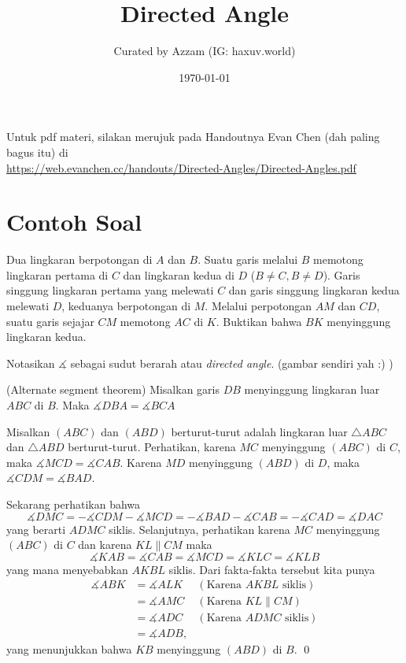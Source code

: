 \documentclass[11pt]{scrartcl}
\title{Directed Angle}
\author{Curated by Azzam (IG: haxuv.world)}
\date{\today}
\begin{document}
	\maketitle
    Untuk pdf materi, silakan merujuk pada Handoutnya Evan Chen (dah paling bagus itu) di \\\url{https://web.evanchen.cc/handouts/Directed-Angles/Directed-Angles.pdf}
    \section{Contoh Soal}
    Dua lingkaran berpotongan di $A$ dan $B$. Suatu garis melalui $B$ memotong lingkaran pertama di $C$ dan lingkaran kedua di $D$ ($B \neq C, B \neq D$).  Garis singgung lingkaran pertama yang melewati $C$ dan garis singgung lingkaran kedua melewati $D$, keduanya berpotongan di $M$. Melalui perpotongan $AM$ dan $CD$, suatu garis sejajar $CM$ memotong $AC$ di $K$. Buktikan bahwa $BK$ menyinggung lingkaran kedua.
    \vspace{0.2cm}
    \begin{solusi}
        Notasikan $\measuredangle$ sebagai sudut berarah atau \textit{directed angle}. (gambar sendiri yah :) )
		
		\begin{lemmarev}
		(Alternate segment theorem) Misalkan garis $DB$ menyinggung lingkaran luar $ABC$ di $B$. Maka $\measuredangle DBA = \measuredangle BCA$
		\end{lemmarev}
		Misalkan $(ABC)$ dan $(ABD)$ berturut-turut adalah lingkaran luar $\triangle ABC$ dan $\triangle ABD$ berturut-turut. Perhatikan, karena $MC$ menyinggung $(ABC)$ di $C$, maka $\measuredangle MCD = \measuredangle CAB$. Karena $MD$ menyinggung $(ABD)$ di $D$, maka $\measuredangle CDM = \measuredangle BAD$.
		
		Sekarang perhatikan bahwa $$\measuredangle DMC = -\measuredangle CDM -\measuredangle MCD = -\measuredangle BAD -\measuredangle CAB = -\measuredangle CAD = \measuredangle DAC$$ yang berarti $ADMC$ siklis. Selanjutnya, perhatikan karena $MC$ menyinggung $(ABC)$ di $C$ dan karena $KL \parallel CM$ maka $$\measuredangle KAB = \measuredangle CAB = \measuredangle MCD = \measuredangle KLC = \measuredangle KLB$$ yang mana menyebabkan $AKBL$ siklis.
		Dari fakta-fakta tersebut kita punya 
		\begin{align*}
		\measuredangle ABK &= \measuredangle ALK & (\text{Karena }AKBL \text{ siklis})\\
		&= \measuredangle AMC & (\text{Karena }KL \parallel CM)\\
		&= \measuredangle ADC & (\text{Karena }ADMC \text{ siklis})\\
		&= \measuredangle ADB,
		\end{align*}yang menunjukkan bahwa $KB$ menyinggung $(ABD)$ di $B$. \qed
    \end{solusi}
\end{document}
